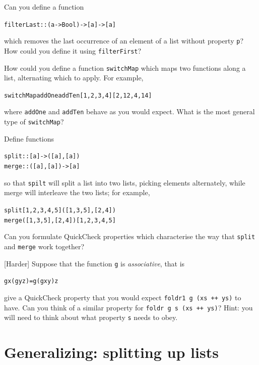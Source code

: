 \begin{exercises}
\item
Can you define a function
\begin{alltt}
filterLast :: (a -> Bool) -> [a] -> [a]
\end{alltt}
which removes the last occurrence of an element of a list without property
\texttt{p}? How could you define it using \texttt{filterFirst}?



\item
How could you define a function \texttt{switchMap} which maps two functions along a list, alternating which to apply. For example,
\begin{alltt}
switchMap addOne addTen [1,2,3,4] \step{}[2,12,4,14]
\end{alltt}
where \texttt{addOne} and \texttt{addTen} behave as you would expect.
What is the most general type of \texttt{switchMap}?

\item
Define functions 
\begin{alltt}
split :: [a] -> ([a],[a])
merge :: ([a],[a]) -> [a]
\end{alltt}
so that \texttt{spilt} will split a list into two lists, picking elements alternately, while merge will interleave the two lists; for example,
\begin{alltt}
split [1,2,3,4,5] \step{}([1,3,5],[2,4])
merge ([1,3,5],[2,4]) \step{}[1,2,3,4,5]
\end{alltt}

\item
Can you formulate QuickCheck properties which characterise the way that \texttt{split} and \texttt{merge} work together?

\item {[Harder]}
Suppose that the function \texttt{g} is \emph{associative}, that is
\begin{alltt}
g x (g y z) = g (g x y) z
\end{alltt}
give a QuickCheck property that you would expect \texttt{foldr1 g (xs ++ ys)} to have. Can you think of a similar property for \texttt{foldr g s (xs ++ ys)}? Hint: you will need to think about what property \texttt{s} needs to obey.



\end{exercises}


\section{Generalizing: splitting up lists}

